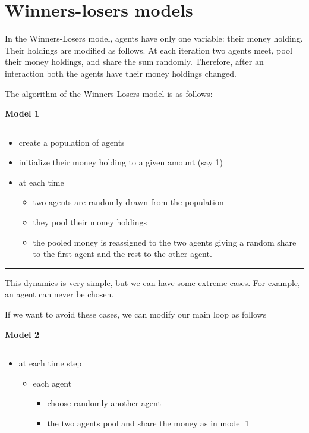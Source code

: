 \documentclass{article}
\providecommand{\tightlist}{%
  \setlength{\itemsep}{0pt}\setlength{\parskip}{0pt}}
\begin{document}
\section{Winners-losers models}
In the Winners-Losers model, agents have only one variable: their money holding. Their holdings are modified as follows. At each iteration two agents meet, pool their money holdings, and share the sum randomly.  
Therefore, after an interaction both the agents have their money holdings changed.

The algorithm of the Winners-Losers model is as follows:

\vskip2mm
\noindent\textbf{Model 1}
\vskip1mm
\hrule

\begin{itemize}
\tightlist
\item
  create a population of agents
\item
  initialize their money holding to a given amount (say 1)
\item
  at each time

  \begin{itemize}
  \tightlist
  \item
    two agents are randomly drawn from the population
  \item
    they pool their money holdings
  \item
    the pooled money is reassigned to the two agents giving a random
    share to the first agent and the rest to the other agent.
  \end{itemize}
\end{itemize}
\vskip-2mm
\hrule

\vskip4mm
This dynamics is very simple, but we can have some extreme cases. For
example, an agent can never be chosen.

If we want to avoid these cases, we can modify our main loop as follows

\vskip2mm
\noindent\textbf{Model 2}
\vskip1mm
\hrule

\begin{itemize}
\tightlist
\item
  at each time step

  \begin{itemize}
  \tightlist
  \item
    each agent

    \begin{itemize}
    \tightlist
    \item
      choose randomly another agent
    \item
      the two agents pool and share the money as in model 1
    \end{itemize}
  \end{itemize}
\end{itemize}
\end{document}
